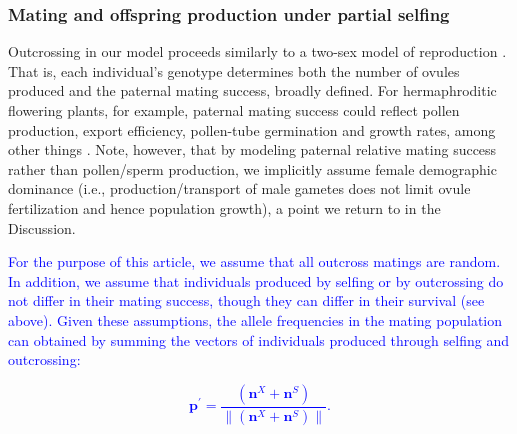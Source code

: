 \documentclass[11pt]{article}
\def\mbf#1{\mathbf{#1}}
\begin{document}
\subsubsection*{Mating and offspring production under partial selfing}
 Outcrossing in our model proceeds similarly to a two-sex model of reproduction \citep{deVriesCaswell2019b}. That is, each individual's genotype determines both the number of ovules produced and the paternal mating success, broadly defined. For hermaphroditic flowering plants, for example, paternal mating success could reflect pollen production, export efficiency, pollen-tube germination and growth rates, among other things \citep{LloydWebb1986, WangBarrett2020, Harder2016}. Note, however, that by modeling paternal relative mating success rather than pollen/sperm production, we implicitly assume female demographic dominance (i.e., production/transport of male gametes does not limit ovule fertilization and hence population growth), a point we return to in the Discussion. 

 \textcolor{blue}{ For the purpose of this article, we assume that all outcross matings are random. In addition, we assume that individuals produced by selfing or by outcrossing do not differ in their mating success, though they can differ in their survival (see above). Given these assumptions, the allele frequencies in the mating population can obtained by summing the vectors of individuals produced through selfing and outcrossing:
\begin{linenomath*}
\begin{equation}
 	\mbf{p}^{\prime}=\frac{(\mbf{n}^X + \mbf{n}^S)}{\| (\mbf{n}^X + \mbf{n}^S)\|}.
 \end{equation}
\end{linenomath*}}
\end{document}
